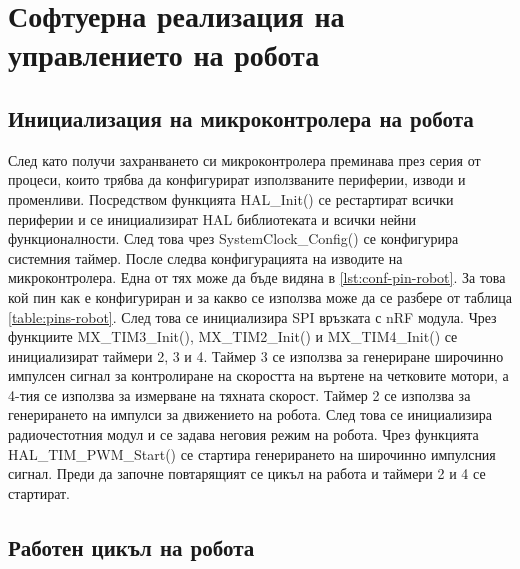 \section{Софтуерна реализация на управлението на робота}
\label{sec:software-robot}


\subsection{Инициализация на микроконтролера на робота}
\label{ssec:init-robot}

След като получи захранването си микроконтролера преминава през серия от процеси, които трябва да конфигурират използваните периферии, изводи и променливи. Посредством функцията HAL\_Init() се рестартират всички периферии и се инициализират HAL библиотеката и всички нейни функционалности. След това чрез SystemClock\_Config() се конфигурира системния таймер. После следва конфигурацията на изводите на микроконтролера. Една от тях може да бъде видяна в \autoref{lst:conf-pin-robot}. За това кой пин как е конфигуриран и за какво се използва може да се разбере от таблица \cref{table:pins-robot}. След това се инициализира SPI връзката с nRF модула. Чрез функциите MX\_TIM3\_Init(), MX\_TIM2\_Init() и MX\_TIM4\_Init() се инициализират таймери 2, 3 и 4. Таймер 3 се използва за генериране широчинно импулсен сигнал за контролиране на скоростта на въртене на четковите мотори, а 4-тия се използва за измерване на тяхната скорост. Таймер 2 се използва за генерирането на импулси за движението на робота. След това се инициализира радиочестотния модул и се задава неговия режим на робота. Чрез функцията HAL\_TIM\_PWM\_Start() се стартира генерирането на широчинно импулсния сигнал. Преди да започне повтарящият се цикъл на работа и таймери 2 и 4 се стартират.





\subsection{Работен цикъл на робота}
\label{ssec:loop-robot}

